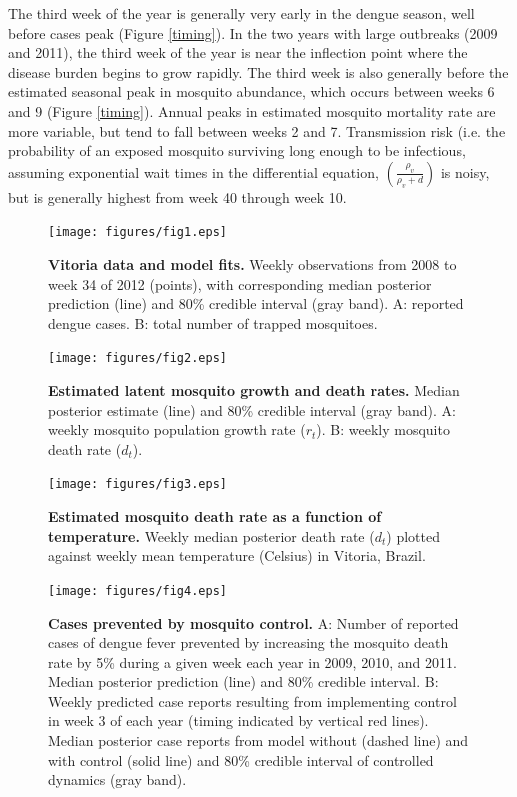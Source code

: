 \documentclass[10pt,letterpaper]{article}
\begin{document}
The third week of the year is generally very early in the dengue season, well before cases peak (Figure \ref{timing}).
In the two years with large outbreaks (2009 and 2011), the third week of the year is near the inflection point where the disease burden begins to grow rapidly.  
The third week is also generally before the estimated seasonal peak in mosquito abundance, which occurs between weeks 6 and 9 (Figure \ref{timing}).
Annual peaks in estimated mosquito mortality rate are more variable, but tend to fall between weeks 2 and 7.
Transmission risk (i.e. the probability of an exposed mosquito surviving long enough to be infectious, assuming exponential wait times in the differential equation, $\left(\frac{\rho_v}{\rho_v + d}\right)$ is noisy, but is generally highest from week 40 through week 10.

\begin{figure}[!h]
\texttt{[image: figures/fig1.eps]}
\caption{{\bf Vitoria data and model fits.}
Weekly observations from 2008 to week 34 of 2012 (points), with corresponding median posterior prediction (line) and 80\% credible interval (gray band). A: reported dengue cases. B: total number of trapped mosquitoes.
}
\label{timeseries}
\end{figure}

\begin{figure}[!h]
\texttt{[image: figures/fig2.eps]}
\caption{{\bf Estimated latent mosquito growth and death rates.}
Median posterior estimate (line) and 80\% credible interval (gray band).  A: weekly mosquito population growth rate ($r_t$). B: weekly mosquito death rate ($d_t$).
}
\label{latent}
\end{figure}

\begin{figure}[!h]
\texttt{[image: figures/fig3.eps]}
\caption{{\bf Estimated mosquito death rate as a function of temperature.}
Weekly median posterior death rate ($d_t$) plotted against weekly mean temperature (Celsius) in Vitoria, Brazil.
}
\label{temp}
\end{figure}

\begin{figure}[!h]
\texttt{[image: figures/fig4.eps]}
\caption{{\bf Cases prevented by mosquito control.}
A: Number of reported cases of dengue fever prevented by increasing the mosquito death rate by 5\% during a given week each year in 2009, 2010, and 2011. Median posterior prediction (line) and 80\% credible interval. B: Weekly predicted case reports resulting from implementing control in week 3 of each year (timing indicated by vertical red lines).  Median posterior case reports from model without (dashed line) and with control (solid line) and 80\% credible interval of controlled dynamics (gray band).
}
\label{control}
\end{figure}
\end{document}

